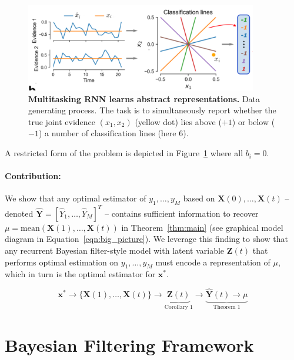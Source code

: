 \documentclass[12pt]{article}
\begin{document}
\begin{figure}[h! tbp]
	\centering 
	\includegraphics[width=0.9\textwidth]{media/multitask_fig2a.png}
	\caption[Multitasking RNN learns abstract representations]{\textbf{Multitasking RNN learns abstract representations. } Data generating process. The task is to simultaneously report whether the true joint evidence $(x_1,x_2)$ (yellow dot) lies above ($+1$) or below ($-1$) a number of classification lines (here 6).}
	\label{fig:2a}
\end{figure}

A restricted form of the problem is depicted in Figure~\ref{fig:2a} where all $b_i = 0$.

\paragraph{Contribution: } We show that any optimal estimator of $y_1, \dots, y_M$ based on $\mathbf X(0), \dots, \mathbf X(t)$ -- denoted $\hat{\mathbf Y} = [\hat Y_1, \dots, \hat Y_M]^T$ -- contains sufficient information to recover $\mu = \text{mean}(\mathbf X(1), \dots, \mathbf X(t))$ in Theorem~\ref{thm:main} (see graphical model diagram in Equation~\ref{eqn:big_picture}). 
We leverage this finding to show that any recurrent Bayesian filter-style model with latent variable $\mathbf Z(t)$ that performs optimal estimation on $y_1, \dots, y_M$ must encode a representation of $\mu$, which in turn is the optimal estimator for $\mathbf x^*$. 

\begin{equation}
	\label{eqn:big_picture}
	\mathbf x^* \to \{\mathbf X(1), \dots, \mathbf X(t)\} \to 
	\underbrace{\mathbf Z(t)}_{\text{Corollary 1}}
	\to 
	\underbrace{\hat{\mathbf Y}(t) \to \mu}_{\text{Theorem 1}}
\end{equation}




\section{Bayesian Filtering Framework}
\label{sec:bayes_framework}
\end{document}
